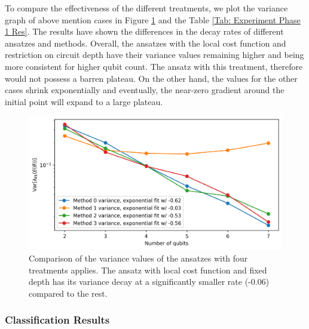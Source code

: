 To compare the effectiveness of the different treatments, we plot the variance graph of above mention cases in Figure \ref{Fig: Plot Variances} and the Table \ref{Tab: Experiment Phase 1 Res}.
The results have shown the differences in the decay rates of different ansatzes and methods.
Overall, the ansatzes with the local cost function and restriction on circuit depth have their variance values remaining higher and being more consistent for higher qubit count.
The ansatz with this treatment, therefore would not possess a barren plateau.
On the other hand, the values for the other cases shrink exponentially and eventually, the near-zero gradient around the initial point will expand to a large plateau.


\begin{figure}
    \includegraphics[width=\linewidth]{Artefact/Appendices/variances.png}
    \caption{
        Comparison of the variance values of the ansatzes with four treatments applies.
        The ansatz with local cost function and fixed depth has its variance decay at a significantly smaller rate (-0.06) compared to the rest.
    }
    \label{Fig: Plot Variances}
\end{figure}


\subsubsection{Classification Results}


